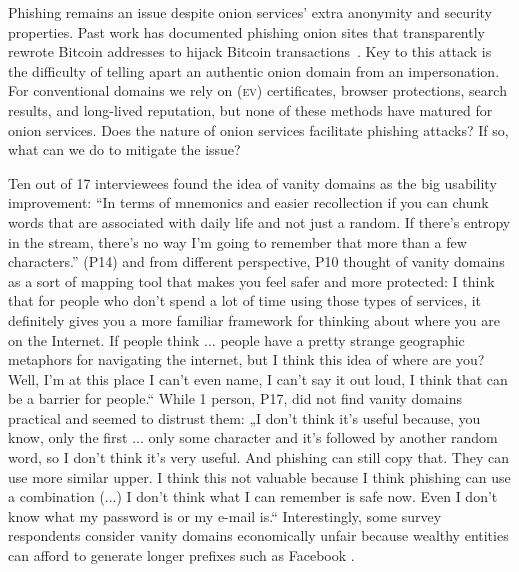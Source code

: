 Phishing remains an issue despite onion services' extra anonymity and security
properties.  Past work has documented phishing onion sites that transparently
rewrote Bitcoin addresses to hijack Bitcoin
transactions~\cite{Winter2016a,Nurmi2015a,Monteiro2016a}.  Key to this attack is
the difficulty of telling apart an authentic onion domain from an impersonation.
For conventional domains we rely on (\textsc{ev}) certificates, browser
protections, search results, and long-lived reputation, but none of these
methods have matured for onion services.  Does the nature of onion services
facilitate phishing attacks?  If so, what can we do to mitigate the issue?


Ten out of 17 interviewees found the idea of vanity domains as the big usability improvement: “In terms of mnemonics and easier recollection if you can chunk words that are associated with daily life and not just a random. If there's entropy in the stream, there's no way I'm going to remember that more than a few characters.” (P14) and from different perspective, P10 thought of vanity domains as a sort of mapping tool that makes you feel safer and more protected: I think that for people who don't spend a lot of time using those types of services, it definitely gives you a more familiar framework for thinking about where you are on the Internet. If people think ... people have a pretty strange geographic metaphors for navigating the internet, but I think this idea of where are you? Well, I'm at this place I can't even name, I can't say it out loud, I think that can be a barrier for people.“ While 1 person, P17, did not find vanity domains practical and seemed to distrust them: „I don't think it's useful because, you know, only the first ... only some character and it's followed by another random word, so I don't think it's very useful. And phishing can still copy that. They can use more similar upper. I think this not valuable because I think phishing can use a combination (...) I don't think what I can remember is safe now. Even I don't know what my password is or my e-mail is.“ Interestingly, some  survey
respondents consider vanity domains economically unfair because wealthy entities
can afford to generate longer prefixes such as Facebook .


